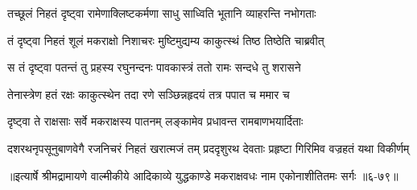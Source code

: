 \twolineshloka
{तच्छूलं निहतं दृष्ट्वा रामेणाक्लिष्टकर्मणा}
{साधु साध्विति भूतानि व्याहरन्ति नभोगताः} %

\twolineshloka
{तं दृष्ट्वा निहतं शूलं मकराक्षो निशाचरः}
{मुष्टिमुद्यम्य काकुत्स्थं तिष्ठ तिष्ठेति चाब्रवीत्} %

\twolineshloka
{स तं दृष्ट्वा पतन्तं तु प्रहस्य रघुनन्दनः}
{पावकास्त्रं ततो रामः सन्दधे तु शरासने} %

\twolineshloka
{तेनास्त्रेण हतं रक्षः काकुत्स्थेन तदा रणे}
{सञ्छिन्नहृदयं तत्र पपात च ममार च} %

\twolineshloka
{दृष्ट्वा ते राक्षसाः सर्वे मकराक्षस्य पातनम्}
{लङ्कामेव प्रधावन्त रामबाणभयार्दिताः} %

\twolineshloka
{दशरथनृपसूनुबाणवेगै रजनिचरं निहतं खरात्मजं तम्}
{प्रददृशुरथ देवताः प्रहृष्टा गिरिमिव वज्रहतं यथा विकीर्णम्} %


॥इत्यार्षे श्रीमद्रामायणे वाल्मीकीये आदिकाव्ये युद्धकाण्डे मकराक्षवधः नाम एकोनाशीतितमः सर्गः ॥६-७९॥

